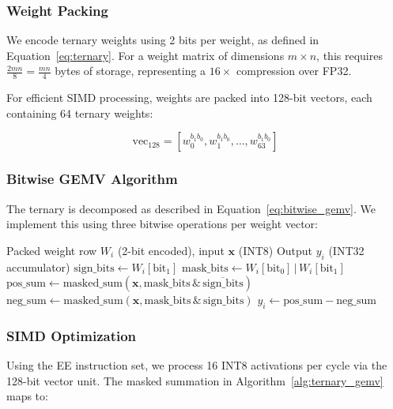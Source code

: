 \subsubsection{Weight Packing}

We encode ternary weights using 2 bits per weight, as defined in
Equation~\ref{eq:ternary}. For a weight matrix of dimensions $m \times n$,
this requires $\frac{2mn}{8} = \frac{mn}{4}$ bytes of storage, representing
a $16\times$ compression over FP32.

For efficient SIMD processing, weights are packed into 128-bit vectors,
each containing 64 ternary weights:

\begin{equation}
\text{vec}_{128} = [w_0^{b_1b_0}, w_1^{b_1b_0}, \ldots, w_{63}^{b_1b_0}]
\end{equation}

\subsubsection{Bitwise GEMV Algorithm}

The ternary \gemv{} is decomposed as described in
Equation~\ref{eq:bitwise_gemv}. We implement this using three bitwise
operations per weight vector:

\begin{algorithm}[H]
\caption{Ternary \gemv{} --- single output element $y_i$}
\label{alg:ternary_gemv}
\begin{algorithmic}[1]
\REQUIRE Packed weight row $W_i$ (2-bit encoded), input $\mathbf{x}$ (INT8)
\ENSURE Output $y_i$ (INT32 accumulator)
\STATE $\text{sign\_bits} \leftarrow W_i[\text{bit}_1]$
\STATE $\text{mask\_bits} \leftarrow W_i[\text{bit}_0] \,|\, W_i[\text{bit}_1]$
\STATE $\text{pos\_sum} \leftarrow \text{masked\_sum}(\mathbf{x}, \text{mask\_bits} \,\&\, \overline{\text{sign\_bits}})$
\STATE $\text{neg\_sum} \leftarrow \text{masked\_sum}(\mathbf{x}, \text{mask\_bits} \,\&\, \text{sign\_bits})$
\STATE $y_i \leftarrow \text{pos\_sum} - \text{neg\_sum}$
\end{algorithmic}
\end{algorithm}

\subsubsection{SIMD Optimization}

Using the EE instruction set, we process 16 INT8 activations per cycle
via the 128-bit vector unit. The masked summation in
Algorithm~\ref{alg:ternary_gemv} maps to:

